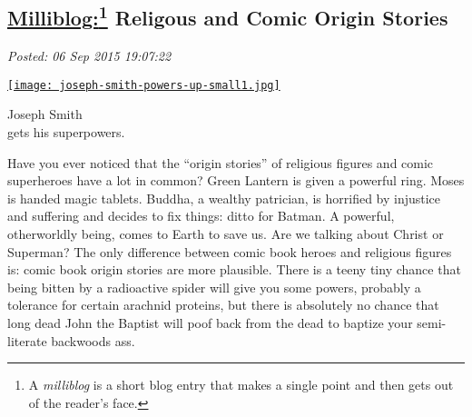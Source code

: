%

\subsection*{\href{https://bakerjd99.wordpress.com/2015/09/06/milliblog-religous-and-comic-origin-stories/}{Milliblog:\footnote{A \emph{milliblog} is a short blog entry that makes a single point and
  then gets out of the reader's face.} Religous and Comic Origin Stories}}


\noindent\emph{Posted: 06 Sep 2015 19:07:22}
\vspace{6pt}



\captionsetup[floatingfigure]{labelformat=empty}
\begin{floatingfigure}[r]{0.27\textwidth}
\centering
\href{https://bakerjd99.wordpress.com/2015/09/06/milliblog-religous-and-comic-origin-stories/joseph-smith-powers-up-small-2/}{\texttt{[image: joseph-smith-powers-up-small1.jpg]}}
\caption{Joseph Smith\\gets his superpowers.}
\label{fig:5154X0}
\end{floatingfigure} Have you ever noticed that the ``origin stories'' of religious figures
and comic superheroes have a lot in common? Green Lantern is given a
powerful ring. Moses is handed magic tablets. Buddha, a wealthy
patrician, is horrified by injustice and suffering and decides to fix
things: ditto for Batman. A powerful, otherworldly being, comes to Earth
to save us. Are we talking about Christ or Superman? The only difference
between comic book heroes and religious figures is: comic book origin
stories are more plausible. There is a teeny tiny chance that being
bitten by a radioactive spider will give you some powers, probably a
tolerance for certain arachnid proteins, but there is absolutely no
chance that long dead John the Baptist will poof back from the dead to
baptize your semi-literate backwoods ass.


